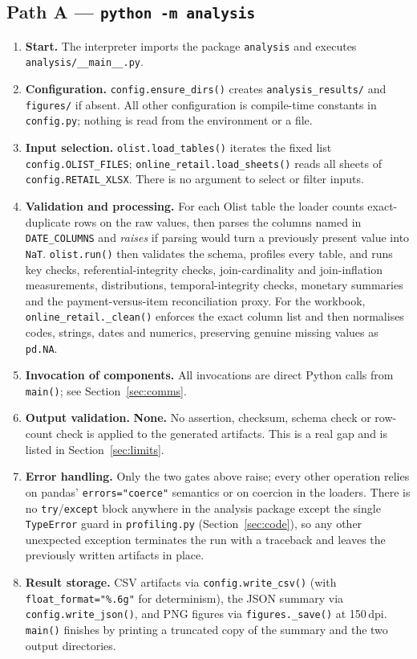 \documentclass[11pt,a4paper]{article}
\newcommand{\code}[1]{\texttt{#1}}
\begin{document}
\subsection{Path A --- \code{python -m analysis}}
\begin{enumerate}
\item \textbf{Start.} The interpreter imports the package \code{analysis} and executes \code{analysis/\_\_main\_\_.py}.
\item \textbf{Configuration.} \code{config.ensure\_dirs()} creates \code{analysis\_results/} and \code{figures/} if absent. All other configuration is compile-time constants in \code{config.py}; nothing is read from the environment or a file.
\item \textbf{Input selection.} \code{olist.load\_tables()} iterates the fixed list \code{config.OLIST\_FILES}; \code{online\_retail.load\_sheets()} reads all sheets of \code{config.RETAIL\_XLSX}. There is no argument to select or filter inputs.
\item \textbf{Validation and processing.} For each Olist table the loader counts exact-duplicate rows on the raw values, then parses the columns named in \code{DATE\_COLUMNS} and \emph{raises} if parsing would turn a previously present value into \code{NaT}. \code{olist.run()} then validates the schema, profiles every table, and runs key checks, referential-integrity checks, join-cardinality and join-inflation measurements, distributions, temporal-integrity checks, monetary summaries and the payment-versus-item reconciliation proxy. For the workbook, \code{online\_retail.\_clean()} enforces the exact column list and then normalises codes, strings, dates and numerics, preserving genuine missing values as \code{pd.NA}.
\item \textbf{Invocation of components.} All invocations are direct Python calls from \code{main()}; see Section~\ref{sec:comms}.
\item \textbf{Output validation.} \textbf{None.} No assertion, checksum, schema check or row-count check is applied to the generated artifacts. This is a real gap and is listed in Section~\ref{sec:limits}.
\item \textbf{Error handling.} Only the two gates above raise; every other operation relies on pandas' \code{errors="coerce"} semantics or on coercion in the loaders. There is no \code{try}/\code{except} block anywhere in the analysis package except the single \code{TypeError} guard in \code{profiling.py} (Section~\ref{sec:code}), so any other unexpected exception terminates the run with a traceback and leaves the previously written artifacts in place.
\item \textbf{Result storage.} CSV artifacts via \code{config.write\_csv()} (with \code{float\_format="\%.6g"} for determinism), the JSON summary via \code{config.write\_json()}, and PNG figures via \code{figures.\_save()} at 150\,dpi. \code{main()} finishes by printing a truncated copy of the summary and the two output directories.
\end{enumerate}
\end{document}
